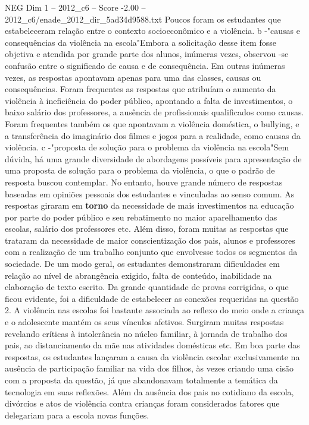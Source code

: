 \begin{textsample}{NEG Dim 1 – 2012\_c6 – Score -2.00 – 2012\_c6/enade\_2012\_dir\_5ad34d9588.txt}
Poucos foram os estudantes que estabeleceram relação entre o contexto socioeconômico e a violência. b -"causas e consequências da violência na escola"Embora a solicitação desse item fosse objetiva e atendida por grande parte dos alunos, inúmeras vezes, observou -se confusão entre o significado de causa e de consequência.
Em outras inúmeras vezes, as respostas apontavam apenas para uma das classes, causas ou consequências.
Foram frequentes as respostas que atribuíam o aumento da violência à ineficiência do poder público, apontando a falta de investimentos, o baixo salário dos professores, a ausência de profissionais qualificados como causas.
Foram frequentes também os que apontavam a violência doméstica, o bullying, e a transferência do imaginário dos filmes e jogos para a realidade, como causas da violência. c -"proposta de solução para o problema da violência na escola"Sem dúvida, há uma grande diversidade de abordagens possíveis para apresentação de uma proposta de solução para o problema da violência, o que o padrão de resposta buscou contemplar.
No entanto, houve grande número de respostas baseadas em opiniões pessoais dos estudantes e vinculadas ao senso comum.
As respostas giraram em \textbf{torno} da necessidade de mais investimentos na educação por parte do poder público e seu rebatimento no maior aparelhamento das escolas, salário dos professores etc.
Além disso, foram muitas as respostas que trataram da necessidade de maior conscientização dos pais, alunos e professores com a realização de um trabalho conjunto que envolvesse todos os segmentos da sociedade.
De um modo geral, os estudantes demonstraram dificuldades em relação ao nível de abrangência exigido, falta de conteúdo, inabilidade na elaboração de texto escrito.
Da grande quantidade de provas corrigidas, o que ficou evidente, foi a dificuldade de estabelecer as conexões requeridas na questão 2.
A violência nas escolas foi bastante associada ao reflexo do meio onde a criança e o adolescente mantém os seus vínculos afetivos.
Surgiram muitas respostas revelando críticas à intolerância no núcleo familiar, à jornada de trabalho dos pais, ao distanciamento da mãe nas atividades domésticas etc.
Em boa parte das respostas, os estudantes lançaram a causa da violência escolar exclusivamente na ausência de participação familiar na vida dos filhos, às vezes criando uma cisão com a proposta da questão, já que abandonavam totalmente a temática da tecnologia em suas reflexões.
Além da ausência dos pais no cotidiano da escola, divórcios e atos de violência contra crianças foram considerados fatores que delegariam para a escola novas funções.

\end{textsample}
